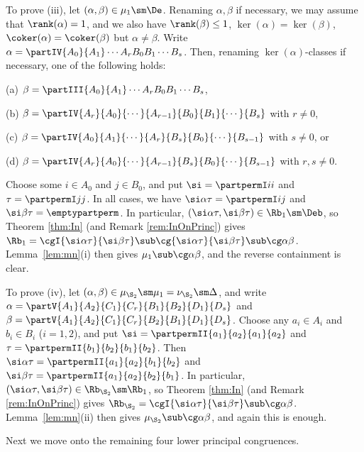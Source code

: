 To prove (iii), let $(\alpha,\beta)\in\mu_1\sm\De$.
Renaming $\alpha,\beta$ if necessary, we may assume that $\rank(\alpha)=1$, and we also have $\rank(\beta)\leq1$, $\ker(\alpha)=\ker(\beta)$, $\coker(\alpha)=\coker(\beta)$ but $\alpha\not=\beta$.  Write $\alpha=\partIV{A_0}{A_1}\cdots{A_r}{B_0}{B_1}\cdots{B_s}$.  Then, renaming $\ker(\alpha)$-classes if necessary, one of the following holds:
\begin{itemize}\begin{multicols}{2}
\item[(a)] $\beta=\partIII{A_0}{A_1}\cdots{A_r}{B_0}{B_1}\cdots{B_s}$,
\item[(b)] $\beta = \partIV{A_r}{A_0}{\cdots}{A_{r-1}}{B_0}{B_1}{\cdots}{B_s}$ with $r\not=0$, 
\item[(c)] $\beta = \partIV{A_0}{A_1}{\cdots}{A_r}{B_s}{B_0}{\cdots}{B_{s-1}}$ with $s\not=0$, or
\item[(d)] $\beta = \partIV{A_r}{A_0}{\cdots}{A_{r-1}}{B_s}{B_0}{\cdots}{B_{s-1}}$ with $r,s\not=0$.
\end{multicols}\end{itemize}
Choose some $i\in A_0$ and $j\in B_0$, and put $\si=\partpermI ii$ and $\tau=\partpermI jj$.  In all cases, we have $\si\alpha\tau=\partpermI ij$ and $\si\beta\tau = \emptypartperm$.  In particular, $(\si\alpha\tau,\si\beta\tau)\in\Rb_1\sm\Deb$, so Theorem \ref{thm:In} (and Remark \ref{rem:InOnPrinc}) gives $\Rb_1=\cgI{\si\alpha\tau}{\si\beta\tau}\sub\cg{\si\alpha\tau}{\si\beta\tau}\sub\cg\alpha\beta$.  Lemma~\ref{lem:mn}(i) then gives $\mu_1\sub\cg\alpha\beta$, and the reverse containment is clear.

To prove (iv), let $(\alpha,\beta)\in\mu_{\S_2}\sm\mu_1=\nu_{\S_2}\sm\Delta$, and write $\alpha=\partV{A_1}{A_2}{C_1}{C_r}{B_1}{B_2}{D_1}{D_s}$ and $\beta=\partV{A_1}{A_2}{C_1}{C_r}{B_2}{B_1}{D_1}{D_s}$.  Choose any $a_i\in A_i$ and $b_i\in B_i$ ($i=1,2$), and put $\si=\partpermII{a_1}{a_2}{a_1}{a_2}$ and $\tau=\partpermII{b_1}{b_2}{b_1}{b_2}$.  Then $\si\alpha\tau=\partpermII{a_1}{a_2}{b_1}{b_2}$ and $\si\beta\tau=\partpermII{a_1}{a_2}{b_2}{b_1}$.  In particular, $(\si\alpha\tau,\si\beta\tau)\in\Rb_{\S_2}\sm\Rb_1$, so Theorem \ref{thm:In} (and Remark \ref{rem:InOnPrinc}) gives $\Rb_{\S_2}=\cgI{\si\alpha\tau}{\si\beta\tau}\sub\cg\alpha\beta$.  Lemma~\ref{lem:mn}(ii) then gives $\mu_{\S_2}\sub\cg\alpha\beta$, and again this is enough.  \epf

Next we move onto the remaining four lower principal congruences.


